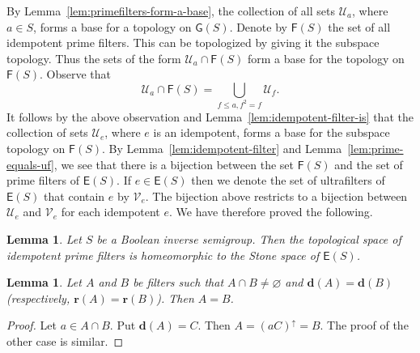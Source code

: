 \documentclass[a4paper]{amsart}
\newtheorem{lemma}[theorem]{Lemma}
\begin{document}
By Lemma~\ref{lem:primefilters-form-a-base}, the collection of all sets $\mathscr{U}_{a}$, where $a \in S$,
forms a base for a topology on $\mathsf{G}(S)$.
Denote by $\mathsf{F}(S)$ the set of all idempotent prime filters.
This can be topologized by giving it the subspace topology.
Thus the sets of the form $\mathscr{U}_{a} \cap \mathsf{F}(S)$ form a base for the topology on $\mathsf{F}(S)$.
Observe that 
$$\mathscr{U}_{a} \cap \mathsf{F}(S) = \bigcup_{f \leq a, f^{2} = f} \mathscr{U}_{f}.$$
It follows by the above observation and Lemma~\ref{lem:idempotent-filter-is}
that the collection of sets $\mathscr{U}_{e}$, where $e$ is an idempotent, forms a base for the subspace
topology on $\mathsf{F}(S)$.
By Lemma~\ref{lem:idempotent-filter} and Lemma~\ref{lem:prime-equals-uf},
we see that there is a bijection between the set $\mathsf{F}(S)$ and the set of prime filters of $\mathsf{E}(S)$.
If $e \in \mathsf{E}(S)$ then we denote the set of ultrafilters of $\mathsf{E}(S)$
that contain $e$ by $\mathscr{V}_{e}$.
The bijection above restricts to a bijection between $\mathscr{U}_{e}$ and $\mathscr{V}_{e}$
for each idempotent $e$.
We have therefore proved the following.


\begin{lemma}\label{lem:topology-idempotent} Let $S$ be a Boolean inverse semigroup.
Then the topological space of idempotent prime filters is homeomorphic to the Stone space of $\mathsf{E}(S)$.
\end{lemma}


\begin{lemma}\label{lem:local-bisection} Let $A$ and $B$ be filters such that $A \cap B \neq \varnothing$
and $\mathbf{d}(A) = \mathbf{d}(B)$ (respectively, $\mathbf{r}(A) = \mathbf{r}(B)$). Then $A = B$.
\end{lemma}
\begin{proof} Let $a \in A \cap B$.
Put $\mathbf{d}(A) = C$.
Then $A = (aC)^{\uparrow} = B$.
The proof of the other case is similar.
\end{proof}
\end{document}
